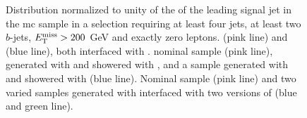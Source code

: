 \begin{figure}[htb]
\centering 
{}
\caption{Distribution normalized to unity of the \pt of the leading signal jet in the \ttbar \gls{mc} sample in a selection requiring at least four jets, at least two $b$-jets, $E_{\rm T}^{\mathrm{miss}}>200$ GeV and exactly zero leptons. 
 \PowhegBox (pink line) and \aNLO (blue line), both interfaced with \HWpp.
 nominal sample (pink line), generated with \PowhegBox and showered with \PY, and a sample generated with \PowhegBox and showered with \HWpp (blue line).
 Nominal sample (pink line) and two varied samples generated with \PowhegBox interfaced with two versions of \PY (blue and green line).}\label{fig:ttbar_ptj1_0L_syst}
\end{figure}


